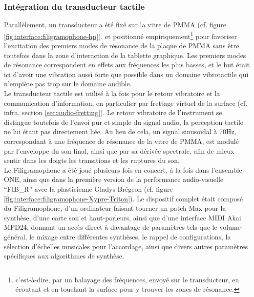 \subsubsection{Intégration du transducteur tactile}

\noindent Parallèlement, un transducteur a été fixé sur la vitre de \gls{PMMA} (cf. figure \ref{fig:interface:filigramophone-hp}), et positionné empiriquement\footnote{c'est-à-dire, par un balayage des fréquences, envoyé sur le transducteur, en écoutant et en touchant la surface pour y trouver les zones de résonance.} pour favoriser l'excitation des premiers modes de résonance de la plaque de \gls{PMMA} sans être toutefois dans la zone d'interaction de la tablette graphique. Les premiers modes de résonance correspondent en effets aux fréquences les plus basses, et le but était ici d'avoir une vibration aussi forte que possible dans un domaine vibrotactile qui n'empiète pas trop sur le domaine audible.\\
\indent Le transducteur tactile est utilisé à la fois pour le retour vibratoire et la communication d'information, en particulier par frettage virtuel de la surface (cf. infra, section \ref{sec:audio-fretting}). Le retour vibratoire de l'instrument se distingue toutefois de l'envoi pur et simple du signal audio, la perception tactile ne lui étant pas directement liée. Au lieu de cela, un signal sinusoïdal à 70Hz, correspondant à une fréquence de résonance de la vitre de \gls{PMMA}, est modulé par l'enveloppe du son final, ainsi que par sa dérivée spectrale, afin de mieux sentir dans les doigts les transitions et les ruptures du son.\\
\indent Le Filigramophone a été joué plusieurs fois en concert, à la fois dans l'ensemble ONE, ainsi que dans la première version de la performance audio-visuelle ``FIB\_R'' avec la plasticienne Gladys Brégeon (cf. figure \ref{fig:interface:filigramophone-Xypre-Triton}). Le dispositif complet était composé du Filigramophone, d'un ordinateur faisant tourner un patch Max pour la synthèse, d'une carte son et haut-parleurs, ainsi que d'une interface \gls{MIDI} Akai MPD24, donnant un accès direct à davantage de paramètres tels que le volume général, le mixage entre différentes synthèses, le rappel de configurations, la sélection d'échelles musicales pour l'accordage, ainsi que divers autres paramètres spécifiques aux algorithmes de synthèse.

